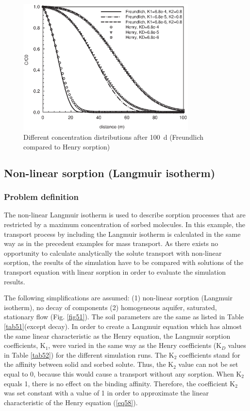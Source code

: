 \begin{figure}[htbp]
\centering
\includegraphics[width=0.8\textwidth]{PART_II/C/fig55.EPS}
\caption{Different concentration distributions after 100~d (Freundlich compared to Henry sorption)}
\label{fig55}
\end{figure}


\subsection{Non-linear sorption (Langmuir isotherm)}

\subsubsection{Problem definition}

The non-linear Langmuir isotherm is used to describe sorption processes that are restricted by a maximum concentration of sorbed molecules. In this example, the transport process by including the Langmuir isotherm is calculated in the same way as in the precedent examples for mass transport. As there exists no opportunity to calculate analytically the solute transport with non-linear sorption, the results of the simulation have to be compared with solutions of the transport equation with linear sorption in order to evaluate the simulation results.

The following simplifications are assumed: (1) non-linear sorption (Langmuir isotherm), no decay of components (2) homogeneous aquifer, saturated, stationary flow (Fig. \ref{fig51}).
%
The soil parameters are the same as listed in Table \ref{tab51}(except decay). In order to create a Langmuir equation which has almost the same linear characteristic as the Henry equation, the Langmuir sorption coefficients, K$_1$, were varied in the same way as the Henry coefficients (K$_D$ values in Table \ref{tab52}) for the different simulation runs. The K$_2$ coefficients stand for the affinity between solid and sorbed solute. Thus, the K$_2$ value can not be set equal to 0, because this would cause a transport without any sorption. When K$_2$ equals 1, there is no effect on the binding affinity. Therefore, the coefficient K$_2$ was set constant with a value of 1 in order to approximate the linear characteristic of the Henry equation (\ref{eq58}).

